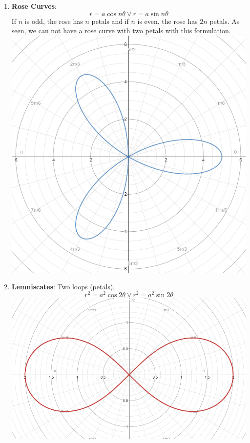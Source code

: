 \documentclass[12pt]{article}
\begin{document}
\begin{enumerate}
\newpage
\item \textbf{Rose Curves}: $$r= a \cos n\theta \vee r=a \sin n\theta$$
If $n$ is odd, the rose has $n$ petals and if $n$ is even, the rose has $2n$ petals. As seen, we can not have a rose curve with two petals with this formulation.
\includegraphics[scale=0.6]{rose.png}

\newpage
\item \textbf{Lemniscates}: Two loops (petals), $$r^2=a^2 \cos 2\theta \vee r^2= a^2 \sin 2\theta$$
\includegraphics[scale=0.57]{lemniscate.png}

\end{enumerate}
\end{document}

